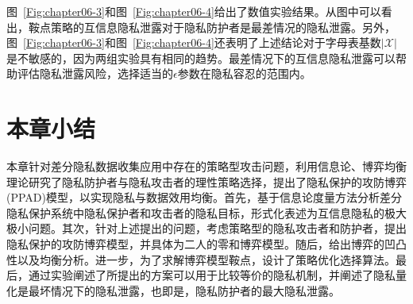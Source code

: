 图~\ref{Fig:chapter06-3}和图~\ref{Fig:chapter06-4}给出了数值实验结果。从图中可以看出，鞍点策略的互信息隐私泄露对于隐私防护者是最差情况的隐私泄露。另外，图~\ref{Fig:chapter06-3}和图~\ref{Fig:chapter06-4}还表明了上述结论对于字母表基数$|\mathcal{X}|$是不敏感的，因为两组实验具有相同的趋势。最差情况下的互信息隐私泄露可以帮助评估隐私泄露风险，选择适当的$\epsilon$参数在隐私容忍的范围内。

\section{本章小结}\label{sec:chapter06-conclusion}

本章针对差分隐私数据收集应用中存在的策略型攻击问题，利用信息论、博弈均衡理论研究了隐私防护者与隐私攻击者的理性策略选择，提出了隐私保护的攻防博弈(PPAD)模型，以实现隐私与数据效用均衡。首先，基于信息论度量方法分析差分隐私保护系统中隐私保护者和攻击者的隐私目标，形式化表述为互信息隐私的极大极小问题。其次，针对上述提出的问题，考虑策略型的隐私攻击者和防护者，提出隐私保护的攻防博弈模型，并具体为二人的零和博弈模型。随后，给出博弈的凹凸性以及均衡分析。进一步，为了求解博弈模型鞍点，设计了策略优化选择算法。最后，通过实验阐述了所提出的方案可以用于比较等价的隐私机制，并阐述了隐私量化是最坏情况下的隐私泄露，也即是，隐私防护者的最大隐私泄露。
